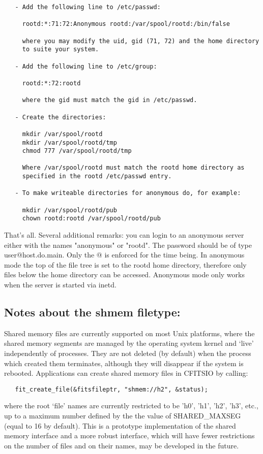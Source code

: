\documentclass[11pt]{book}
\begin{document}
\begin{verbatim}
   - Add the following line to /etc/passwd:

     rootd:*:71:72:Anonymous rootd:/var/spool/rootd:/bin/false

     where you may modify the uid, gid (71, 72) and the home directory
     to suite your system.

   - Add the following line to /etc/group:

     rootd:*:72:rootd

     where the gid must match the gid in /etc/passwd.

   - Create the directories:

     mkdir /var/spool/rootd
     mkdir /var/spool/rootd/tmp
     chmod 777 /var/spool/rootd/tmp

     Where /var/spool/rootd must match the rootd home directory as
     specified in the rootd /etc/passwd entry.

   - To make writeable directories for anonymous do, for example:

     mkdir /var/spool/rootd/pub
     chown rootd:rootd /var/spool/rootd/pub
\end{verbatim}
That's all.  Several additional remarks:  you can login to an anonymous
server either with the names "anonymous" or "rootd".  The password should
be of type user@host.do.main. Only the @ is enforced for the time
being.  In anonymous mode the top of the file tree is set to the rootd
home directory, therefore only files below the home directory can be
accessed.  Anonymous mode only works when the server is started via
inetd.


\subsection{Notes about the shmem filetype:}

Shared memory files are currently supported on most Unix platforms,
where the shared memory segments are managed by the operating system
kernel and `live' independently of processes. They are not deleted (by
default) when the process which created them terminates, although they
will disappear if the system is rebooted.  Applications can create
shared memory files in CFITSIO by calling:

\begin{verbatim}
   fit_create_file(&fitsfileptr, "shmem://h2", &status);
\end{verbatim}
where the root `file' names are currently restricted to be 'h0', 'h1',
'h2', 'h3', etc., up to a maximum number defined by the the value of
SHARED\_MAXSEG (equal to 16 by default).  This is a prototype
implementation of the shared memory interface and a more robust
interface, which will have fewer restrictions on the number of files
and on their names, may be developed in the future.
\end{document}
